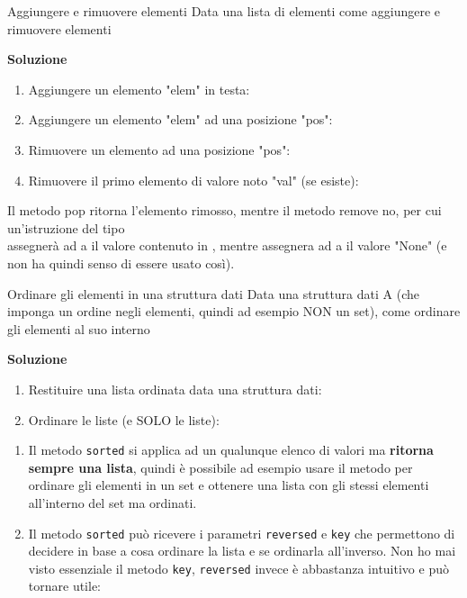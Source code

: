 \documentclass[10pt]{extarticle}
\makeatletter
\newcommand{\<}{\langle}
\renewcommand{\>}{\rangle}
\renewenvironment{proof}[1][\proofname] {\par\pushQED{\qed}
\renewcommand*{\proofname}{Soluzione}
{\normalfont\sffamily\bfseries\topsep6\p@\@plus6\p@\relax #1\@addpunct{.} }}{\popQED\endtrivlist\@endpefalse}
\theoremstyle{mystyle}{\newtheorem*{remark}{Nota}}
\theoremstyle{mystyle}{\newtheorem*{remarks}{Note}}
\theoremstyle{mystyle}{\newtheorem*{example}{Esempio}}
\theoremstyle{mystyle}{\newtheorem*{examples}{Esempi}}
\theoremstyle{definition}{\newtheorem*{exercise}{Exercise}}
\theoremstyle{warn}
\makeatother
\begin{document}
\begin{definition}{Aggiungere e rimuovere elementi}{}
Data una lista di elementi  come aggiungere e rimuovere elementi
\end{definition}
\begin{proof}
\begin{enumerate}
    \item Aggiungere un elemento "elem" in testa: 
    \item Aggiungere un elemento "elem" ad una posizione "pos": 
    \item Rimuovere un elemento ad una posizione "pos": 
    \item Rimuovere il primo elemento di valore noto "val" (se esiste): 
\end{enumerate}
\end{proof}
\begin{remark}
Il metodo pop ritorna l'elemento rimosso, mentre il metodo remove no, per cui un'istruzione del tipo \\ assegnerà ad a il valore contenuto in , mentre  assegnera ad a il valore "None" (e non ha quindi senso di essere usato così).
\end{remark}

\begin{definition}{Ordinare gli elementi in una struttura dati}{}
Data una struttura dati A (che imponga un ordine negli elementi, quindi ad esempio NON un set), come ordinare gli elementi al suo interno
\end{definition}
\begin{proof}
\begin{enumerate}
	\item Restituire una lista ordinata data una struttura dati: 
	\item Ordinare le liste (e SOLO le liste): 
\end{enumerate}
\end{proof}
\begin{remarks} \leavevmode
\begin{enumerate}
	\item Il metodo \texttt{sorted} si applica ad un qualunque elenco di valori ma \textbf{ritorna sempre una lista}, quindi è possibile ad esempio usare il metodo per ordinare gli elementi in un set e ottenere una lista con gli stessi elementi all'interno del set ma ordinati.
	\item Il metodo \texttt{sorted} può ricevere i parametri \texttt{reversed} e \texttt{key} che permettono di decidere in base a cosa ordinare la lista e se ordinarla all'inverso. Non ho mai visto essenziale il metodo \texttt{key}, \texttt{reversed} invece è abbastanza intuitivo e può tornare utile: 
\end{enumerate}
\end{remarks}
\end{document}
